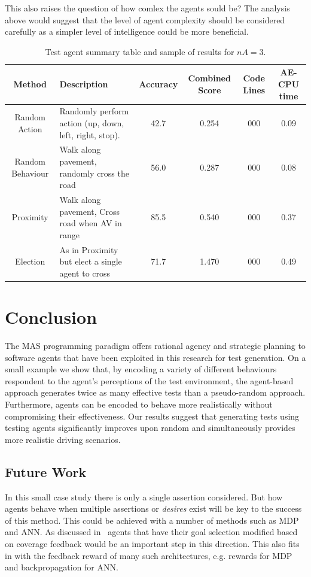 \documentclass[letterpaper, 10 pt, journal, twoside]{IEEEtran}
\begin{document}
This also raises the question of how comlex the agents sould be? The analysis above would suggest that the level of agent complexity should be considered carefully as a simpler level of intelligence could be more beneficial. %


\begin{table}
\centering
\caption{Test agent summary table and sample of results for $nA=3$.}
\label{ResultsTable}
\begin{tabular}{|c||p{7cm}|c|c|c|c|}
\hline
Method & Description & Accuracy & Combined Score & Code Lines & AE-CPU time \\
\hline
Random Action & Randomly perform action (up, down, left, right, stop). & 42.7 & 0.254 & 000& 0.09 \\
Random Behaviour & Walk along pavement, randomly cross the road & 56.0 & 0.287 & 000& 0.08 \\
Proximity & Walk along pavement, Cross road when AV in range & 85.5 & 0.540 & 000& 0.37 \\
Election & As in Proximity but elect a single agent to cross & 71.7 & 1.470 & 000&0.49\\
\hline 
\end{tabular}
\end{table}


\section{Conclusion}
The MAS programming paradigm offers rational agency and strategic planning to software agents that have been exploited in this research for test generation. 
%
On a small example we show that, by encoding a variety of different behaviours respondent to the agent's perceptions of the test environment, the agent-based approach generates twice as many effective tests than a pseudo-random approach. Furthermore, agents can be encoded to behave more realistically without compromising their effectiveness. %
Our results suggest that generating tests using testing agents significantly improves upon random and simultaneously provides more realistic driving scenarios.



\subsection{Future Work}
%
In this small case study there is only a single assertion considered. But how agents behave when multiple assertions or \textit{desires} exist will be key to the success of this method. This could be achieved with a number of methods such as MDP and ANN.
%
As discussed in~\cite{Eder2007} agents that have their goal selection modified based on coverage feedback would be an important step in this direction. This also fits in with the feedback reward of many such architectures, e.g. rewards for MDP and backpropagation for ANN. 
\end{document}
